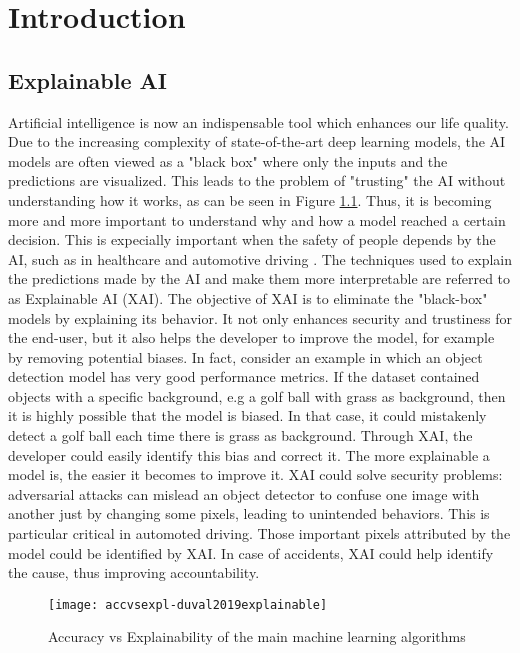 \chapter{Introduction}

\section{Explainable AI}
Artificial intelligence is now an indispensable tool which enhances our life quality.
Due to the increasing complexity of state-of-the-art deep learning models, the AI models are often viewed as a "black box" where only the inputs and the predictions are visualized. This leads to the problem of "trusting" the AI without understanding how it works, as can be seen in Figure \ref{fig:accvsexpl}. Thus, it is becoming more and more important to understand why and how a model reached a certain decision. This is expecially important when the safety of people depends by the AI, such as in healthcare and automotive driving \cite{abeloos2022explaining}.
The techniques used to explain the predictions made by the AI and make them more interpretable are referred to as Explainable AI (XAI). The objective of XAI is to eliminate the "black-box" models by explaining its behavior.
It not only enhances security and trustiness for the end-user, but it also helps the developer to improve the model, for example by removing potential biases. In fact, consider an example in which an object detection model has very good performance metrics. If the dataset contained objects with a specific background, e.g a golf ball with grass as background, then it is highly possible that the model is biased. In that case, it could mistakenly detect a golf ball each time there is grass as background. Through XAI, the developer could easily identify this bias and correct it.
The more explainable a model is, the easier it becomes to improve it. 
XAI could solve security problems: adversarial attacks can mislead an object detector to confuse one image with another just by changing some pixels, leading to unintended behaviors. This is particular critical in automoted driving. Those important pixels attributed by the model could be identified by XAI.
In case of accidents, XAI could help identify the cause, thus improving accountability.
\begin{figure}[h]
    \centering
    \texttt{[image: accvsexpl-duval2019explainable]}
    \caption{Accuracy vs Explainability of the main machine learning algorithms \cite{duval2019explainable}}
    \label{fig:accvsexpl}
    \end{figure}


